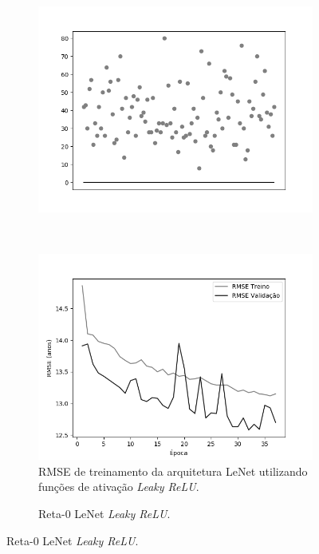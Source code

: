 \begin{figure}[hb!]
\begin{subfigure}[hb]{0.5\linewidth}
			\includegraphics[width=\linewidth]{img/graficos/reta0/lenet/fig-reta-0-image-treat-3-lenet-relu.png}%
		\end{subfigure}\\
		\begin{subfigure}[hb]{0.5\linewidth}
			\caption{RMSE de treinamento da arquitetura LeNet utilizando funções de ativação \emph{Leaky ReLU}.}
			\label{fig:redeneuralbiologica}
			\includegraphics[width=\linewidth]{img/graficos/history/lenet/fig-history-image-treat-3-lenet-lrelu-rmse.png}
		\end{subfigure}
		\begin{subfigure}[hb]{0.5\linewidth}
			\caption{Reta-0 LeNet \emph{Leaky ReLU}.}
			\label{fig:redeneuralbiologica}

\end{subfigure}
\end{figure}
